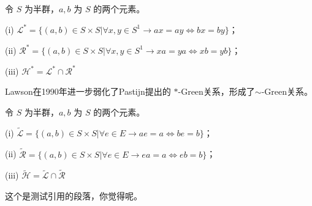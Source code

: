 \begin{definition}
    令 $S$ 为半群，$a, b$ 为 $S$ 的两个元素。

    (i) $\mathcal{L}^{\ast} = \{(a,b)\in S\times S| \forall x,y \in S^1 \rightarrow ax=ay \Leftrightarrow bx=by\}$；

    (ii) $\mathcal{R}^{\ast} = \{(a,b)\in S\times S| \forall x,y \in S^1 \rightarrow xa=ya \Leftrightarrow xb=yb\}$；

    (iii) $\mathcal{H}^{\ast} = \mathcal{L}^{\ast} \cap \mathcal{R}^{\ast}$
\end{definition}

Lawson在1990年进一步弱化了Pastijn提出的 $\ast$-Green关系，形成了$\sim$-Green关系。

\begin{definition}
    令 $S$ 为半群，$a, b$ 为 $S$ 的两个元素。

    (i) $\tilde{\mathcal{L}} = \{(a,b)\in S\times S| \forall e \in E \rightarrow ae=a \Leftrightarrow be=b\}$；

    (ii) $\tilde{\mathcal{R}} = \{(a,b)\in S\times S| \forall e \in E \rightarrow ea=a \Leftrightarrow eb=b\}$；

    (iii) $\tilde{\mathcal{H}} = \tilde{\mathcal{L}} \cap \tilde{\mathcal{R}}$
\end{definition}



这个是测试引用的段落\cite{Ibrahim2022}，你觉得呢\cite{SB2077}。


